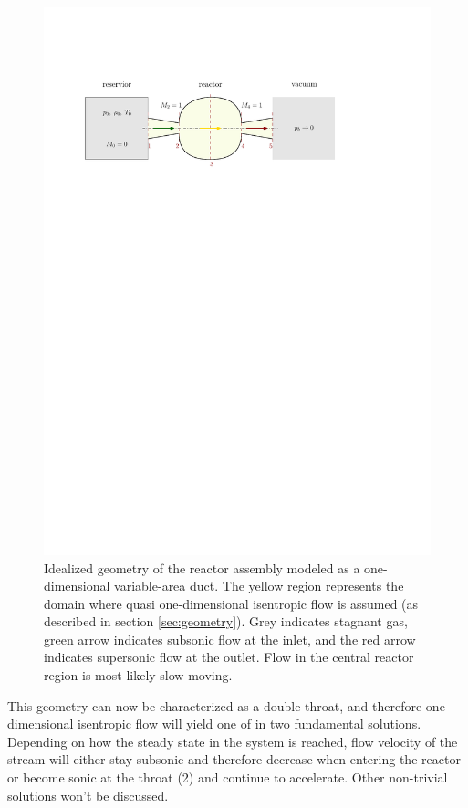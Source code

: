 	\begin{figure}[H]
	    \centering
	    \includegraphics[width=\textwidth]{src/03_analytical-work/fig_1d-flow-geometry}
	    \caption{Idealized geometry of the reactor assembly modeled as a one-dimensional variable-area duct. The yellow region represents the domain where quasi one-dimensional isentropic flow is assumed (as described in section \ref{sec:geometry}). Grey indicates stagnant gas, green arrow indicates subsonic flow at the inlet, and the red arrow indicates supersonic flow at the outlet. Flow in the central reactor region is most likely slow-moving.}
	\end{figure}
	This geometry can now be characterized as a double throat, and therefore one-dimensional isentropic flow will yield one of in two fundamental solutions.
	Depending on how the steady state in the system is reached, flow velocity of the stream will either stay subsonic and therefore decrease when entering the reactor or become sonic at the throat (2) and continue to accelerate.
	Other non-trivial solutions won't be discussed.
	\cite{SALAS1986193, EMMONS1958}


